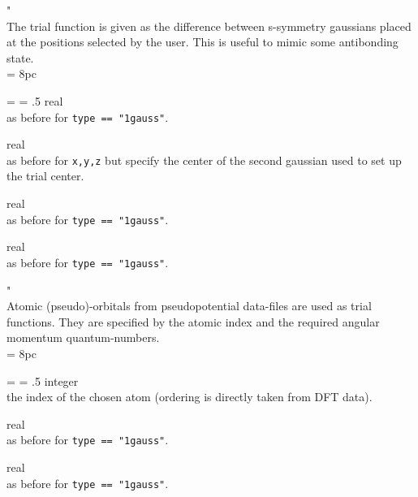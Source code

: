 \bigskip

"\\
\noindent The trial function is given as the difference between s-symmetry gaussians placed
at the positions selected by the user. This is useful to mimic some antibonding state.\\

\newdimen\descindent \descindent = 8pc
{\noindent \leftskip = \descindent \parskip = .5\baselineskip
{}%
{\sc real} \\ as before for {\tt type == "1gauss"}. \par

\noindent{}%
{\sc real} \\ as before for {\tt x,y,z} but specify the center of the second gaussian
            used to set up the trial center.  \par

\noindent{}%
{\sc real} \\  as before for {\tt type == "1gauss"}. \par

\noindent{}%
{\sc real} \\  as before for {\tt type == "1gauss"}. \par
}
\bigskip

"\\
\noindent Atomic (pseudo)-orbitals from pseudopotential data-files are used as trial functions. 
They are specified by the atomic index and the required angular momentum quantum-numbers.\\

\newdimen\descindent \descindent = 8pc
{\noindent \leftskip = \descindent \parskip = .5\baselineskip
{}%
{\sc integer} \\ the index of the chosen atom (ordering is directly taken from DFT data). \par

\noindent{}%
{\sc real} \\ as before for {\tt type == "1gauss"}.\par

\noindent{}%
{\sc real} \\ as before for {\tt type == "1gauss"}.\par
}


